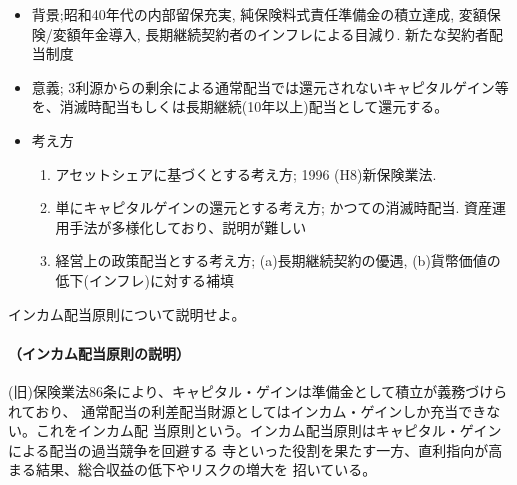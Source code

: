 \documentclass[report,gutter=10mm,fore-edge=10mm,uplatex,dvipdfmx]{jlreq}
\begin{document}
\begin{itemize}
 \item 背景;昭和40年代の内部留保充実, 純保険料式責任準備金の積立達成, 変額保険/変額年金導入, 長期継続契約者のインフレによる目減り.   新たな契約者配当制度
 \item 意義; 3利源からの剰余による通常配当では還元されないキャピタルゲイン等を、消滅時配当もしくは長期継続(10年以上)配当として還元する。
 \item 考え方
\begin{enumerate} [(1)]
 \item アセットシェアに基づくとする考え方;  1996 (H8)新保険業法.  
 \item 単にキャピタルゲインの還元とする考え方; かつての消滅時配当. 資産運用手法が多様化しており、説明が難しい
 \item 経営上の政策配当とする考え方; (a)長期継続契約の優遇, (b)貨幣価値の低下(インフレ)に対する補填
\end{enumerate}
\end{itemize}

インカム配当原則について説明せよ。

\paragraph{（インカム配当原則の説明）}
(旧)保険業法86条により、キャピタル・ゲインは準備金として積立が義務づけられており、
通常配当の利差配当財源としてはインカム・ゲインしか充当できない。これをインカム配
当原則という。インカム配当原則はキャピタル・ゲインによる配当の過当競争を回避する
寺といった役割を果たす一方、直利指向が高まる結果、総合収益の低下やリスクの増大を
招いている。
\end{document}
